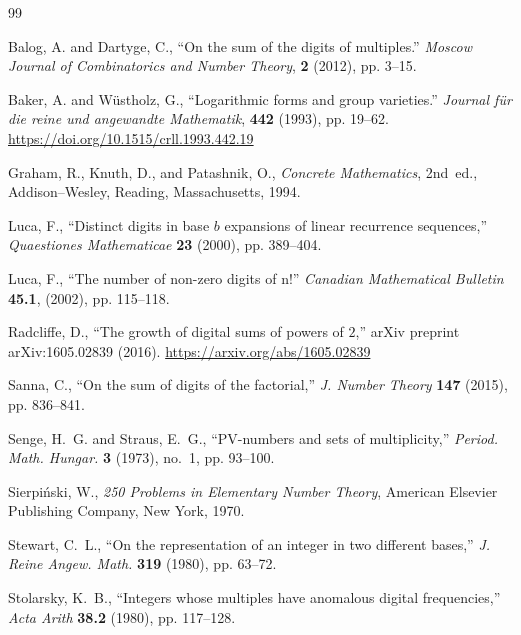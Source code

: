 \documentclass[12pt]{amsart}
\theoremstyle{remark}
\begin{document}
\begin{thebibliography}{99}

    Balog, A. and Dartyge, C.,
    ``On the sum of the digits of multiples.''
    \textit{Moscow Journal of Combinatorics and Number Theory},
    \textbf{2} (2012), pp. 3--15.

    Baker, A. and Wüstholz, G.,
    ``Logarithmic forms and group varieties.''
    \textit{Journal für die reine und angewandte Mathematik},
    \textbf{442} (1993), pp. 19--62. \url{https://doi.org/10.1515/crll.1993.442.19}

    Graham, R., Knuth, D., and Patashnik, O.,
    \emph{Concrete Mathematics}, 2nd~ed.,
    Addison--Wesley, Reading, Massachusetts, 1994.

    Luca, F.,
    ``Distinct digits in base $b$ expansions of linear recurrence sequences,''
    \textit{Quaestiones Mathematicae} \textbf{23} (2000), pp. 389--404.

    Luca, F.,
    ``The number of non-zero digits of n!''
    \textit{Canadian Mathematical Bulletin} \textbf{45.1}, (2002), pp. 115--118.

    Radcliffe, D.,
    ``The growth of digital sums of powers of $2$,''
    arXiv preprint arXiv:1605.02839 (2016). \url{https://arxiv.org/abs/1605.02839}

    Sanna, C.,
    ``On the sum of digits of the factorial,''
    \textit{J. Number Theory} \textbf{147} (2015), pp. 836--841.

    Senge, H.\ G. and Straus, E.\ G.,
    ``PV-numbers and sets of multiplicity,''
    \textit{Period. Math. Hungar.} \textbf{3} (1973), no.~1, pp. 93--100.

    Sierpiński, W.,
    \textit{250 Problems in Elementary Number Theory},
    American Elsevier Publishing Company, New York, 1970.

    Stewart, C.\ L.,
    ``On the representation of an integer in two different bases,''
    \textit{J. Reine Angew. Math.} \textbf{319} (1980), pp. 63--72.

    Stolarsky, K.\ B.,
    ``Integers whose multiples have anomalous digital frequencies,''
    \textit{Acta Arith} \textbf{38.2} (1980), pp. 117--128.

\end{thebibliography}
\end{document}
